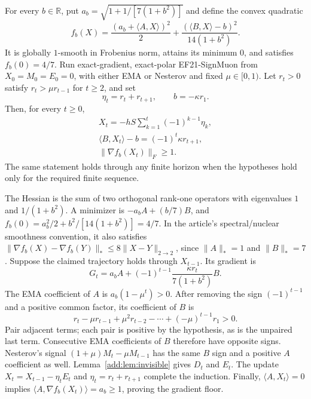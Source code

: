 \begin{theorem}
\label{add:thm:ef_uniform}
For every $b\in\mathbb R$, put
$a_b=\sqrt{1+1/[7(1+b^2)]}$ and define the convex quadratic
\begin{equation}\label{add:eq:quadratic}
 f_b(X)=\frac{(a_b+\langle A,X\rangle)^2}{2}
       +\frac{(\langle B,X\rangle-b)^2}{14(1+b^2)}.
\end{equation}
It is globally $1$-smooth in Frobenius norm, attains its minimum $0$, and satisfies
$f_b(0)=4/7$. Run exact-gradient, exact-polar EF21-SignMuon from
$X_0=M_0=E_0=0$, with either EMA or Nesterov and fixed
$\mu\in[0,1)$.
Let $r_t>0$ satisfy $r_t>\mu r_{t-1}$ for $t\ge2$, and set
\[
 \eta_t=r_t+r_{t+1},\qquad b=-\kappa r_1.
\]
Then, for every $t\ge0$,
\begin{gather*}
 X_t=-hS\sum_{k=1}^t(-1)^{k-1}\eta_k,\\
 \langle B,X_t\rangle-b=(-1)^t\kappa r_{t+1},\\
 \|\nabla f_b(X_t)\|_F\ge1.
\end{gather*}
The same statement holds through any finite horizon when the hypotheses
hold only for the required finite sequence.
\end{theorem}

\begin{paperproof}
The Hessian is the sum of two orthogonal rank-one operators with
eigenvalues $1$ and $1/(1+b^2)$. A minimizer is
$-a_bA+(b/7)B$, and
$f_b(0)=a_b^2/2+b^2/[14(1+b^2)]=4/7$.
In the article's spectral/nuclear smoothness convention, it also satisfies
$\|\nabla f_b(X)-\nabla f_b(Y)\|_*\le8\|X-Y\|_{2\to2}$,
since $\|A\|_*=1$ and $\|B\|_*=7$.
Suppose the claimed trajectory holds through $X_{t-1}$. Its gradient is
\[
 G_t=a_bA+(-1)^{t-1}\frac{\kappa r_t}{7(1+b^2)}B.
\]
The EMA coefficient of $A$ is $a_b(1-\mu^t)>0$.
After removing the sign $(-1)^{t-1}$ and a positive common factor,
its coefficient of $B$ is
\[
 r_t-\mu r_{t-1}+\mu^2r_{t-2}-\cdots+(-\mu)^{t-1}r_1>0.
\]
Pair adjacent terms; each pair is positive by the hypothesis, as is
the unpaired last term. Consecutive EMA coefficients of $B$ therefore
have opposite signs. Nesterov's signal
$(1+\mu)M_t-\mu M_{t-1}$ has the same $B$ sign and a positive $A$
coefficient as well. Lemma~\ref{add:lem:invisible} gives $D_t$ and $E_t$.
The update $X_t=X_{t-1}-\eta_tE_t$ and
$\eta_t=r_t+r_{t+1}$ complete the induction.
Finally, $\langle A,X_t\rangle=0$ implies
$\langle A,\nabla f_b(X_t)\rangle=a_b\ge1$, proving the gradient floor.
\end{paperproof}

